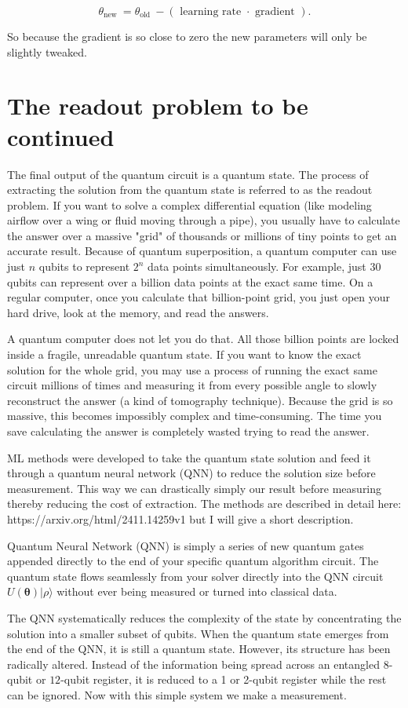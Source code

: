 \documentclass[12pt, oneside]{book}
\begin{document}
$$
\theta_{\text {new }}=\theta_{\text {old }}-(\text { learning rate } \cdot \text { gradient }).
$$

So because the gradient is so close to zero the new parameters will only be slightly tweaked.

\chapter{The readout problem to be continued}

The final output of the quantum circuit is a quantum state. The process of extracting the solution from the quantum state 
is referred to as the readout problem. If you want to solve a complex differential equation (like modeling airflow over a 
wing or fluid moving through a pipe), you usually have to calculate the answer over a massive "grid" of thousands or 
millions of tiny points to get an accurate result. Because of quantum superposition, a quantum computer can use just 
$n$ qubits to represent $2^n$ data points simultaneously. For example, just 30 qubits can represent over a billion data 
points at the exact same time. On a regular computer, once you calculate that billion-point grid, you just open your 
hard drive, look at the memory, and read the answers.

A quantum computer does not let you do that. All those billion points are locked inside a fragile, unreadable quantum 
state. If you want to know the exact solution for the whole grid, you may use a process of running the exact same circuit 
millions of times and measuring it from every possible angle to slowly reconstruct the answer (a kind of tomography 
technique). Because the grid is so massive, this becomes impossibly complex and time-consuming. The time you save 
calculating the answer is completely wasted trying to read the answer.

ML methods were developed to take the quantum state solution and feed it through a quantum neural network (QNN) to 
reduce the solution size before measurement. This way we can drastically simply our result before measuring thereby 
reducing the cost of extraction. The methods are described in detail here: https://arxiv.org/html/2411.14259v1 but 
I will give a short description. 

Quantum Neural Network (QNN) is simply a series of new quantum gates appended directly to the end of your specific 
quantum algorithm circuit. The quantum state flows seamlessly from your solver directly into the QNN circuit 
$U(\boldsymbol{\theta})|\rho\rangle$ without ever being measured or turned into classical data.

The QNN systematically reduces the complexity of the state by concentrating the solution into a smaller subset of qubits. 
When the quantum state emerges from the end of the QNN, it is still a quantum state. However, its structure has been 
radically altered. Instead of the information being spread across an entangled $8$-qubit or $12$-qubit register, 
it is reduced to a 1 or 2-qubit register while the rest can be ignored. Now with this simple system we make a measurement.
\end{document}
